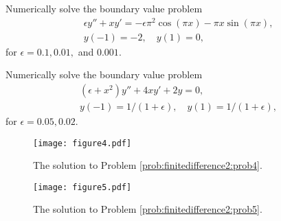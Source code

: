 \begin{problem}
Numerically solve the boundary value problem
\begin{align*}
	\epsilon y'' + xy' = -\epsilon \pi^2 \cos(\pi x) - \pi x \sin(\pi x), \\
	y(-1) = -2, \quad y(1) = 0,
\end{align*}
for $\epsilon = 0.1, 0.01,$ and $0.001$.
\label{prob:finitedifference2:prob4}
\end{problem}

\begin{problem}
Numerically solve the boundary value problem
\begin{align*}
	(\epsilon +x^2)y'' + 4xy' + 2y = 0, \\
	y(-1) = 1/(1+\epsilon), \quad y(1) = 1/(1+\epsilon),
\end{align*}
for $\epsilon = 0.05, 0.02$.
\label{prob:finitedifference2:prob5}
\end{problem}

\begin{figure}[h]
\centering
\texttt{[image: figure4.pdf]}
\caption{The solution to Problem \ref{prob:finitedifference2:prob4}.
}
\end{figure}

\begin{figure}
\centering
\texttt{[image: figure5.pdf]}
\caption{The solution to Problem \ref{prob:finitedifference2:prob5}.
}
\end{figure}